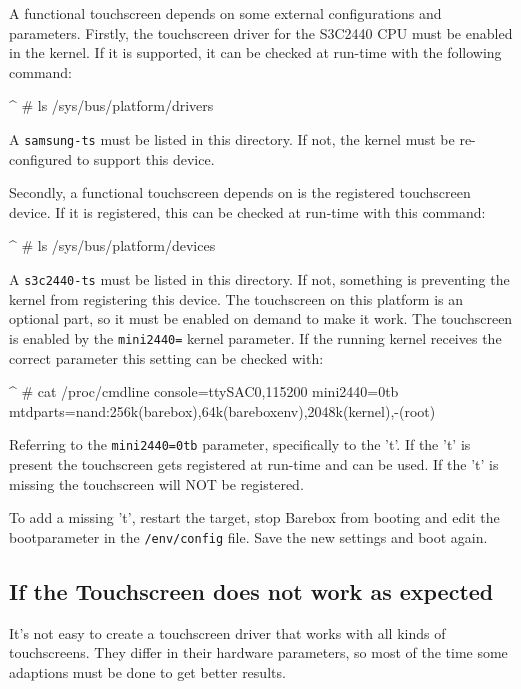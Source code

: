 A functional touchscreen depends on some external configurations and parameters.
Firstly, the touchscreen driver for the S3C2440 CPU must be enabled in the
kernel. If it is supported, it can be checked at run-time with the following
command:

\begin{ptxshell}[escapechar=|]{^}
# ls /sys/bus/platform/drivers
\end{ptxshell}

A \texttt{samsung-ts} must be listed in this directory. If not, the kernel
must be re-configured to support this device.

Secondly, a functional touchscreen depends on is the registered touchscreen
device. If it is registered, this can be checked at run-time with this command:

\begin{ptxshell}[escapechar=|]{^}
# ls /sys/bus/platform/devices
\end{ptxshell}

A \texttt{s3c2440-ts} must be listed in this directory. If not, something
is preventing the kernel from registering this device. The touchscreen on this
platform is an optional part, so it must be enabled on demand to make it work.
The touchscreen is enabled by the \texttt{mini2440=} kernel parameter. If the
running kernel receives the correct parameter this setting can be checked with:

\begin{ptxshell}[escapechar=|]{^}
# cat /proc/cmdline
console=ttySAC0,115200 mini2440=0tb mtdparts=nand:256k(barebox),64k(bareboxenv),2048k(kernel),-(root)
\end{ptxshell}

Referring to the \texttt{mini2440=0tb} parameter, specifically to the 't'.
If the 't' is present the touchscreen gets registered at run-time and can be
used. If the 't' is missing the touchscreen will NOT be registered.

To add a missing 't', restart the target, stop Barebox from booting and edit
the bootparameter in the \texttt{/env/config} file. Save the new settings and
boot again.

\subsection{If the Touchscreen does not work as expected}

It's not easy to create a touchscreen driver that works with all kinds of
touchscreens. They differ in their hardware parameters, so most of the time
some adaptions must be done to get better results.

